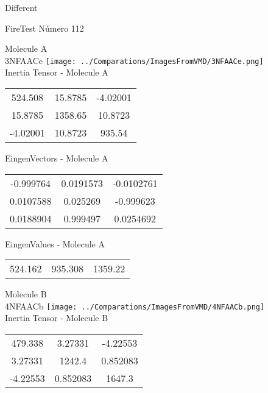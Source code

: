 \begin{center}
\vtab
\vtab
\textcolor{NavyBlue}{\Large Different}
\end{center}

 \newpage

\vtab[-2cm]
\begin{center}
{\large FireTest \tab Número 112}
\end{center}
\begin{multicols}{2}
\begin{center}

Molecule A \\ 
3NFAACe
\texttt{[image: ../Comparations/ImagesFromVMD/3NFAACe.png]}
\\
Inertia Tensor - Molecule A \\
\vtab

\begin{tabular}{|c c c|}
524.508	 & 	15.8785	 & 	-4.02001	 \\
15.8785	 & 	1358.65	 & 	10.8723	 \\
-4.02001	 & 	10.8723	 & 	935.54
\end{tabular}

\vtab
 EingenVectors - Molecule A     \\
\vtab
\begin{tabular}{|c c c|}
-0.999764	 & 	0.0191573	 & 	-0.0102761	 \\
0.0107588	 & 	0.025269	 & 	-0.999623	 \\
0.0188904	 & 	0.999497	 & 	0.0254692
\end{tabular}

\vtab
 EingenValues - Molecule A     \\
\vtab
\begin{tabular}{|c c c|}
524.162	 & 	935.308	 & 	1359.22	 \\
\end{tabular}
\columnbreak

Molecule B \\ 
4NFAACb
\texttt{[image: ../Comparations/ImagesFromVMD/4NFAACb.png]}
\\
Inertia Tensor - Molecule B \\
\vtab

\begin{tabular}{|c c c|}
479.338	 & 	3.27331	 & 	-4.22553	 \\
3.27331	 & 	1242.4	 & 	0.852083	 \\
-4.22553	 & 	0.852083	 & 	1647.3
\end{tabular}


\end{center}
\end{multicols}
